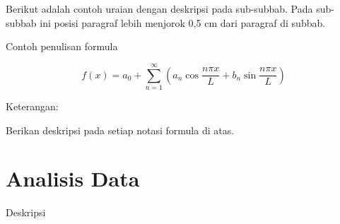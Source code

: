 \begin{ipbsubsubcontent}
Berikut adalah contoh uraian dengan deskripsi pada sub-subbab. Pada sub-subbab
ini posisi paragraf lebih menjorok 0,5 cm dari paragraf di subbab. \dotfill

\noindent\dotfill

\noindent\dotfill

\noindent\dotfill

\noindent\dotfill

\noindent\dotfill

\noindent Contoh penulisan formula

\begin{equation*}
  f(x)=a_{0}+\sum_{n=1}^{\infty}
  \left(a_{n}\cos\frac{n\pi x}{L}
  +b_{n}\sin\frac{n\pi x}{L}\right)
\end{equation*}

\noindent Keterangan:

\noindent Berikan deskripsi pada setiap notasi formula di atas.
\end{ipbsubsubcontent}

\section{Analisis Data}

Deskripsi\dotfill

\noindent\dotfill

\noindent\dotfill

